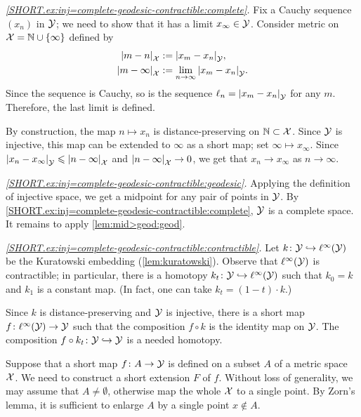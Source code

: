 \textit{\ref{SHORT.ex:inj=complete-geodesic-contractible:complete}.}
Fix a Cauchy sequence $(x_n)$ in $\mathcal{Y}$;
we need to show that it has a limit $x_\infty\in \mathcal{Y}$.
Consider metric on $\mathcal{X}=\mathbb{N}\cup\{\infty\}$ defined by 
\begin{align*}
\dist{m}{n}{\spc{X}}&\df\dist{x_m}{x_n}{\spc{Y}},
\\
\dist{m}{\infty}{\spc{X}}&\df\lim_{n\to\infty}\dist{x_m}{x_n}{\spc{Y}}.
\end{align*}
Since the sequence is Cauchy, so is the sequence $\ell_n=\dist{x_m}{x_n}{\spc{Y}}$ for any $m$.
Therefore, the last limit is defined.

By construction, the map $n\mapsto x_n$ is distance-preserving on $\mathbb{N}\subset \mathcal{X}$.
Since $\mathcal{Y}$ is injective, this map can be extended to $\infty$ as a short map; set $\infty\mapsto x_\infty$.
Since $\dist{x_n}{x_\infty}{\spc{Y}}\le \dist{n}{\infty}{\spc{X}}$ 
and $\dist{n}{\infty}{\spc{X}}\to 0$, we get that
$x_n\to x_\infty$ as $n\to\infty$.

\textit{\ref{SHORT.ex:inj=complete-geodesic-contractible:geodesic}.}
Applying the definition of injective space, we get a midpoint for any pair of points in $\mathcal{Y}$.
By \ref{SHORT.ex:inj=complete-geodesic-contractible:complete},
$\mathcal{Y}$ is a complete space.
It remains to apply \ref{lem:mid>geod:geod}.

\textit{\ref{SHORT.ex:inj=complete-geodesic-contractible:contractible}.}
Let $k\colon\mathcal{Y}\hookrightarrow \ell^\infty(\mathcal{Y})$ be the Kuratowski embedding (\ref{lem:kuratowski}).
Observe that $\ell^\infty(\mathcal{Y})$ is contractible;
in particular, there is a homotopy $k_t\colon\mathcal{Y}\hookrightarrow \ell^\infty(\mathcal{Y})$ such that $k_0=k$ and $k_1$ is a constant map.
(In fact, one can take $k_t=(1-t)\cdot k$.)

Since $k$ is distance-preserving and $\mathcal{Y}$ is injective,
there is a short map $f\colon\ell^\infty(\mathcal{Y})\to \mathcal{Y}$ such that the composition $f\circ k$ is the identity map on $\mathcal{Y}$.
The composition $f\circ k_t\colon\mathcal{Y}\hookrightarrow \mathcal{Y}$ is a needed homotopy. 

Suppose that a short map $f\colon A\to\mathcal{Y}$ is defined on a subset $A$ of a metric space $\mathcal{X}$.
We need to construct a short extension $F$ of $f$.
Without loss of generality, we may assume that $A\ne\emptyset$, otherwise map the whole $\mathcal{X}$ to a single point.
By Zorn's lemma, it is sufficient to enlarge $A$ by a single point $x\notin A$.

